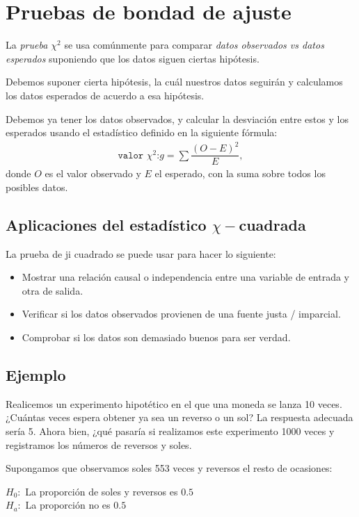 \section{Pruebas de bondad de ajuste}
\label{sec:3.9}

La \emph{prueba $\chi^{2}$} se usa comúnmente para comparar \emph{datos observados vs datos esperados} suponiendo que los datos siguen ciertas hipótesis.


Debemos suponer cierta hipótesis, la cuál nuestros datos seguirán y calculamos los datos esperados de acuerdo a esa hipótesis.


Debemos ya tener los datos observados, y calcular la desviación entre estos y los esperados usando el estadístico definido en la siguiente fórmula:
\begin{align}
	\texttt{valor }\chi^{2}\texttt{:} g= \sum\dfrac{\left( O-E \right)^{2}}{E},
\end{align}
donde $O$ es el valor observado y $E$ el esperado, con la suma sobre todos los posibles datos.

\subsection{Aplicaciones del estadístico $\chi-$cuadrada}
La prueba de ji cuadrado se puede usar para hacer lo siguiente:
\begin{itemize}
	\item Mostrar una relación causal o independencia entre una variable de entrada y otra de salida.
	\item Verificar si los datos observados provienen de una fuente justa / imparcial.
	\item Comprobar si los datos son demasiado buenos para ser verdad.
\end{itemize}


\subsection{Ejemplo}
Realicemos un experimento hipotético en el que una moneda se lanza 10 veces. ¿Cuántas veces espera obtener ya sea un reverso o un sol?  La respuesta adecuada sería 5.  Ahora bien, ¿qué pasaría si realizamos este experimento 1000 veces y registramos los números de reversos y soles.


Supongamos que observamos soles 553 veces y reversos el resto de ocasiones:
\begin{center}
	$H_{0}:$ La proporción de soles y reversos es $0.5$ \\
	$H_{a}:$ La proporción no es $0.5$
\end{center}



